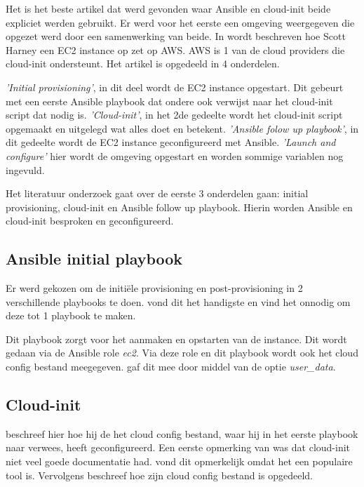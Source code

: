 
Het is het beste artikel dat werd gevonden waar Ansible en cloud-init beide expliciet werden gebruikt. Er werd voor het eerste een omgeving weergegeven die opgezet werd door een samenwerking van beide. In \autocite{scottharney} wordt beschreven hoe Scott Harney een EC2 instance op zet op AWS. AWS is 1 van de cloud providers die cloud-init ondersteunt. Het artikel is opgedeeld in 4 onderdelen. 

\textit{'Initial provisioning'}, in dit deel wordt de EC2 instance opgestart. Dit gebeurt met een eerste Ansible playbook dat ondere ook verwijst naar het cloud-init script dat nodig is. \textit{'Cloud-init'}, in het 2de gedeelte wordt het cloud-init script opgemaakt en uitgelegd wat alles doet en betekent. \textit{'Ansible folow up playbook'}, in dit gedeelte wordt de EC2 instance geconfigureerd met Ansible. \textit{'Launch and configure'} hier wordt de omgeving opgestart en worden sommige variablen nog ingevuld.

Het literatuur onderzoek gaat over de eerste 3 onderdelen gaan: initial provisioning, cloud-init en Ansible follow up playbook. Hierin worden Ansible en cloud-init besproken en geconfigureerd.

\subsection{Ansible initial playbook}
Er werd gekozen om de initiële provisioning en post-provisioning in 2 verschillende playbooks te doen. \autocite{scottharney} vond dit het handigste en vind het onnodig om deze tot 1 playbook te maken. 

Dit playbook zorgt voor het aanmaken en opstarten van de instance. Dit wordt gedaan via de Ansible role \textit{ec2}. Via deze role en dit playbook wordt ook het cloud config bestand meegegeven. \autocite{scottharney} gaf dit mee door middel van de optie \textit{user\_data}. 

\subsection{Cloud-init}
\autocite{scottharney} beschreef hier hoe hij de het cloud config bestand, waar hij in het eerste playbook naar verwees, heeft geconfigureerd. Een eerste opmerking van \autocite{scottharney} was dat cloud-init niet veel goede documentatie had. \autocite{scottharney} vond dit opmerkelijk omdat het een populaire tool is. Vervolgens beschreef \autocite{scottharney} hoe zijn cloud config bestand is opgedeeld.

